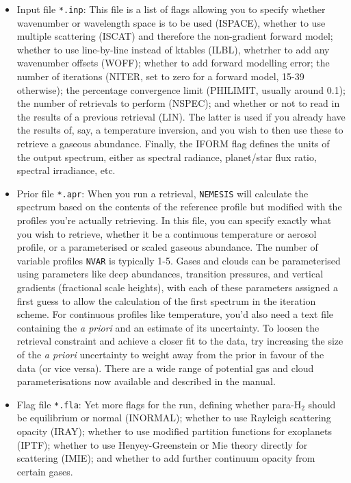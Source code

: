 \documentclass[final,5p,times,twocolumn,authoryear]{elsarticle}
\begin{document}
\begin{itemize}
\item Input file \verb#*.inp#:  This file is a list of flags allowing you to specify whether wavenumber or wavelength space is to be used (ISPACE), whether to use multiple scattering (ISCAT) and therefore the non-gradient forward model; whether to use line-by-line instead of ktables (ILBL), whetrher to add any wavenumber offsets (WOFF); whether to add forward modelling error; the number of iterations (NITER, set to zero for a forward model, 15-39 otherwise); the percentage convergence limit (PHILIMIT, usually around 0.1); the number of retrievals to perform (NSPEC); and whether or not to read in the results of a previous retrieval (LIN).  The latter is used if you already have the results of, say, a temperature inversion, and you wish to then use these to retrieve a gaseous abundance.  Finally, the IFORM flag defines the units of the output spectrum, either as spectral radiance, planet/star flux ratio, spectral irradiance, etc.
\item Prior file \verb#*.apr#:  When you run a retrieval, \verb#NEMESIS# will calculate the spectrum based on the contents of the reference profile but modified with the profiles you're actually retrieving.  In this file, you can specify exactly what you wish to retrieve, whether it be a continuous temperature or aerosol profile, or a parameterised or scaled gaseous abundance.  The number of variable profiles \verb#NVAR# is typically 1-5.  Gases and clouds can be parameterised using parameters like deep abundances, transition pressures, and vertical gradients (fractional scale heights), with each of these parameters assigned a first guess to allow the calculation of the first spectrum in the iteration scheme.  For continuous profiles like temperature, you'd also need a text file containing the \textit{a priori} and an estimate of its uncertainty.  To loosen the retrieval constraint and achieve a closer fit to the data, try increasing the size of the \textit{a priori} uncertainty to weight away from the prior in favour of the data (or vice versa).  There are a wide range of potential gas and cloud parameterisations now available and described in the manual.
\item Flag file \verb#*.fla#:  Yet more flags for the run, defining whether para-H$_2$ should be equilibrium or normal (INORMAL); whether to use Rayleigh scattering opacity (IRAY); whether to use modified partition functions for exoplanets (IPTF); whether to use Henyey-Greenstein or Mie theory directly for scattering (IMIE); and whether to add further continuum opacity from certain gases.

\end{itemize}
\end{document}
